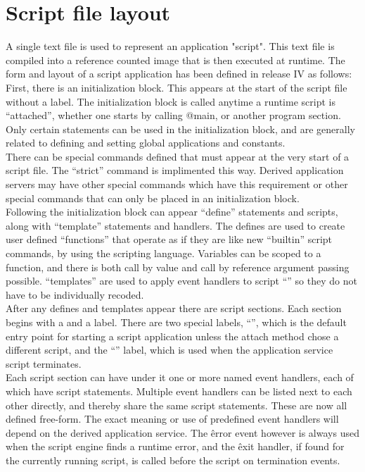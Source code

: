 \documentclass[a4paper,12pt]{article}
\begin{document}
\section{Script file layout}

A single text file is used to represent an application "script".  This text
file is compiled into a reference counted image that is then executed at
runtime.  The form and layout of a script application has been defined in
release IV as follows: \\

First, there is an initialization block.  This appears at the start of the
script file without a label.  The initialization block is called anytime a
runtime script is ``attached'', whether one starts by calling @main, or another
program section.  Only certain statements can be used in the initialization
block, and are generally related to defining and setting global applications
and constants. \\

There can be special commands defined that must appear at the very start of
a script file.  The ``strict'' command is implimented this way.  Derived
application servers may have other special commands which have this
requirement or other special commands that can only be placed in an
initialization block. \\

Following the initialization block can appear ``define'' statements and
scripts, along with ``template'' statements and handlers.  The defines are used
to create user defined ``functions'' that operate as if they are like new
``builtin'' script commands, by using the scripting language.  Variables can be
scoped to a function, and there is both call by value and call by reference
argument passing possible.   ``templates'' are used to apply event handlers
to script ``\@sections'' so they do not have to be individually recoded.  \\

After any defines and templates appear there are script sections.  Each section
begins with a \@ and a label.  There are two special labels, ``\@main'', which
is the default entry point for starting a script application unless the attach
method chose a different script, and the ``\@exit'' label, which is used when
the application service script terminates. \\

Each script section can have under it one or more named event handlers, each of
which have script statements.  Multiple event handlers can be listed next to
each other directly, and thereby share the same script statements.  These are
now all defined free-form.  The exact meaning or use of predefined event
handlers will depend on the derived application service.  The \^error event
however is always used when the script engine finds a runtime error, and the
\^exit handler, if found for the currently running script, is called before the
\@exit script on termination events. \\
\end{document}
